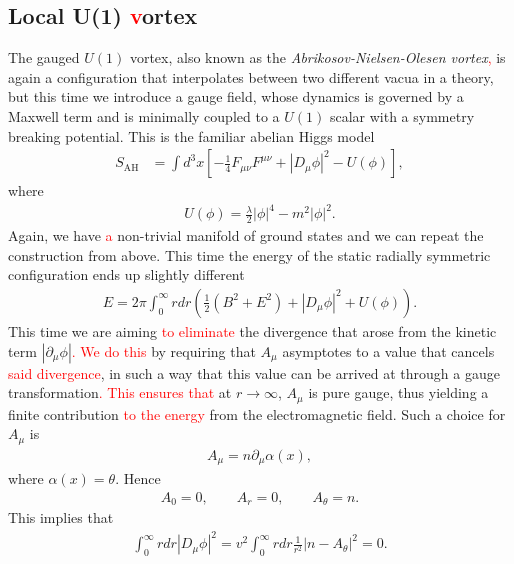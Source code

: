         \subsection{Local U(1) \textcolor{red}{v}ortex}
        The gauged $U(1)$ vortex, also known as the \textit{Abrikosov-Nielsen-Olesen vortex}\textcolor{red}{,} is again a configuration that interpolates between two different vacua in a theory, but this time we introduce a gauge field, whose dynamics is governed by a Maxwell term and is minimally coupled to a $U(1)$ scalar with a symmetry breaking potential. This is the familiar abelian Higgs model
        \begin{align}
            S_{\text{AH}} & = \int d^3x \left[-\frac{1}{4} F_{\mu \nu} F^{\mu \nu} + | D_{\mu} \phi|^2 - U(\phi) \right], \label{eq:Abelian_Higgs_Model}
        \end{align}
        where
        \begin{align}
            U(\phi) = \frac{\lambda}{2} |\phi|^4 - m^2 |\phi|^2.
        \end{align}
    Again, we have \textcolor{red}{a} non-trivial manifold of ground states and we can repeat the construction from above. This time the energy of the static radially symmetric configuration ends up slightly different
    \begin{align}
        E = 2 \pi \int_0^{\infty} r dr \left(\frac{1}{2}( B^2 + E^2) + |D_{\mu} \phi|^2 + U(\phi) \right) .
    \end{align}
    This time we are aiming \textcolor{red}{to eliminate} the divergence that arose from the kinetic term $|\partial_{\mu}\phi|$\textcolor{red}{. We do this} by requiring that $A_{\mu}$ asymptotes to a value that cancels \textcolor{red}{said divergence}, in such a way that this value can be arrived at through a gauge transformation\textcolor{red}{. This ensures that} at $r\rightarrow \infty$, $A_{\mu}$ is pure gauge, thus yielding a finite contribution \textcolor{red}{to the energy} from the electromagnetic field. Such a choice for $A_{\mu}$ is
    \begin{align}
        A_{\mu} = n \partial_{\mu} \alpha(x),
    \end{align}
    where $\alpha(x) = \theta$. Hence
    \begin{align}
        A_0 =0, \qquad A_r =0, \qquad A_{\theta} = n.
    \end{align}
    This implies that
    \begin{align}
        \int_0^{\infty} r dr |D_{\mu}\phi|^2 = v^2\int_0^{\infty} r dr  \frac{1}{r^2}|n-A_{\theta}|^2 =0.
    \end{align}
